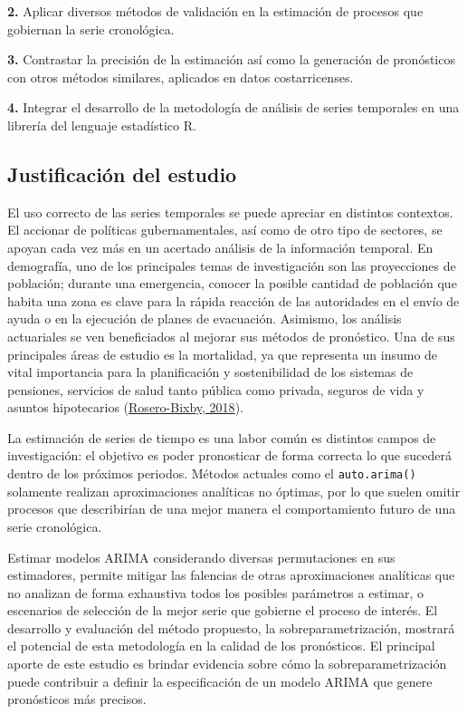 \documentclass[
]{article}
\begin{document}
\textbf{2.} Aplicar diversos métodos de validación en la estimación de
procesos que gobiernan la serie cronológica.

\textbf{3.} Contrastar la precisión de la estimación así como la
generación de pronósticos con otros métodos similares, aplicados en
datos costarricenses.

\textbf{4.} Integrar el desarrollo de la metodología de análisis de
series temporales en una librería del lenguaje estadístico R.

\subsection{Justificación del estudio}

El uso correcto de las series temporales se puede apreciar en distintos
contextos. El accionar de políticas gubernamentales, así como de otro
tipo de sectores, se apoyan cada vez más en un acertado análisis de la
información temporal. En demografía, uno de los principales temas de
investigación son las proyecciones de población; durante una emergencia,
conocer la posible cantidad de población que habita una zona es clave
para la rápida reacción de las autoridades en el envío de ayuda o en la
ejecución de planes de evacuación. Asimismo, los análisis actuariales se
ven beneficiados al mejorar sus métodos de pronóstico. Una de sus
principales áreas de estudio es la mortalidad, ya que representa un
insumo de vital importancia para la planificación y sostenibilidad de
los sistemas de pensiones, servicios de salud tanto pública como
privada, seguros de vida y asuntos hipotecarios
(\protect\hyperlink{ref-supenprodc}{Rosero-Bixby, 2018}).

La estimación de series de tiempo es una labor común es distintos campos
de investigación: el objetivo es poder pronosticar de forma correcta lo
que sucederá dentro de los próximos periodos. Métodos actuales como el
\texttt{auto.arima()} solamente realizan aproximaciones analíticas no
óptimas, por lo que suelen omitir procesos que describirían de una mejor
manera el comportamiento futuro de una serie cronológica.

Estimar modelos ARIMA considerando diversas permutaciones en sus
estimadores, permite mitigar las falencias de otras aproximaciones
analíticas que no analizan de forma exhaustiva todos los posibles
parámetros a estimar, o escenarios de selección de la mejor serie que
gobierne el proceso de interés. El desarrollo y evaluación del método
propuesto, la sobreparametrización, mostrará el potencial de esta
metodología en la calidad de los pronósticos. El principal aporte de
este estudio es brindar evidencia sobre cómo la sobreparametrización
puede contribuir a definir la especificación de un modelo ARIMA que
genere pronósticos más precisos.
\end{document}
